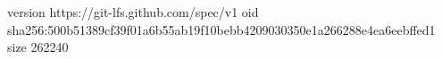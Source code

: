 version https://git-lfs.github.com/spec/v1
oid sha256:500b51389cf39f01a6b55ab19f10bebb4209030350e1a266288e4ea6eebffed1
size 262240
